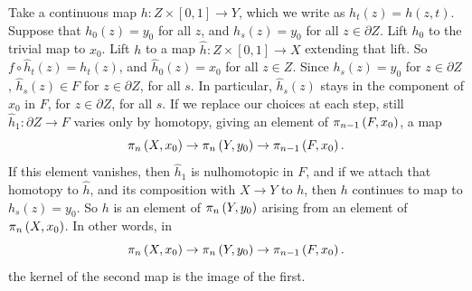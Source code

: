 Take a continuous map \(h \colon Z \times [0,1] \to Y\), which we write as \(h_t(z)=h(z,t)\).
Suppose that \(h_0(z)=y_0\) for all \(z\), and \(h_s(z)=y_0\) for all \(z\in\partial Z\).
Lift \(h_0\) to the trivial map to \(x_0\).
Lift \(h\) to a map \(\hat{h} \colon Z \times [0,1] \to X\) extending that lift.
So \(f \circ \hat{h}_t(z)=h_t(z)\), and \(\hat{h}_0(z)=x_0\) for all \(z \in Z\).
Since \(h_s(z)=y_0\) for \(z \in \partial Z\), \(\hat{h}_s(z) \in F\) for \(z\in\partial Z\), for all \(s\).
In particular, \(\hat{h}_s(z)\) stays in the component of \(x_0\) in \(F\), for \(z\in\partial Z\), for all \(s\).
If we replace our choices at each step, still \(\hat{h}_1 \colon \partial Z \to F\) varies only by homotopy, giving an element of \(\pi_{n-1}\left(F,x_0\right)\), a map
\[
\pi_{n}\left(X,x_0\right)\to\pi_{n}\left(Y,y_0\right)\to\pi_{n-1}\left(F,x_0\right).
\]
If this element vanishes, then \(\hat{h}_1\) is nulhomotopic in \(F\), and if we attach that homotopy to \(\hat{h}\), and its composition with \(X\to Y\) to \(h\), then \(h\) continues to map to \(h_s(z)=y_0\).
So \(h\) is an element of \(\pi_{n}\left(Y,y_0\right)\) arising from an element of \(\pi_{n}\left(X,x_0\right)\).
In other words, in
\[
\pi_{n}\left(X,x_0\right)\to\pi_{n}\left(Y,y_0\right)\to\pi_{n-1}\left(F,x_0\right).
\]
 the kernel of the second map is the image of the first.


